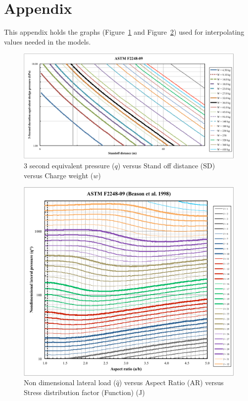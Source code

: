 \documentclass[12pt]{article}
\begin{document}



\section{Appendix}

This appendix holds the graphs (Figure~\ref{Fig_ASTM_F2248-09} and
Figure~\ref{ASTM_F2248-09_BeasonEtAl}) used for interpolating values needed in
the models.

\begin{figure}[h!]
 \begin{center}
 \includegraphics[scale=0.5]{ASTM_F2248-09.pdf}
 \caption{3 second equivalent pressure ($q$) versus Stand off distance ($\text{SD}$) versus
   Charge weight ($w$)}
\label{Fig_ASTM_F2248-09}
 \end{center}
 \end{figure}

 \begin{figure}[h!]
 \begin{center}
 \includegraphics[scale=0.7]{ASTM_F2248-09_BeasonEtAl.pdf}
 \caption{Non dimensional lateral load ($\hat{q}$) versus Aspect Ratio (AR) versus
   Stress distribution factor (Function) (J)}
\label{ASTM_F2248-09_BeasonEtAl}
 \end{center}
 \end{figure}
\end{document}
